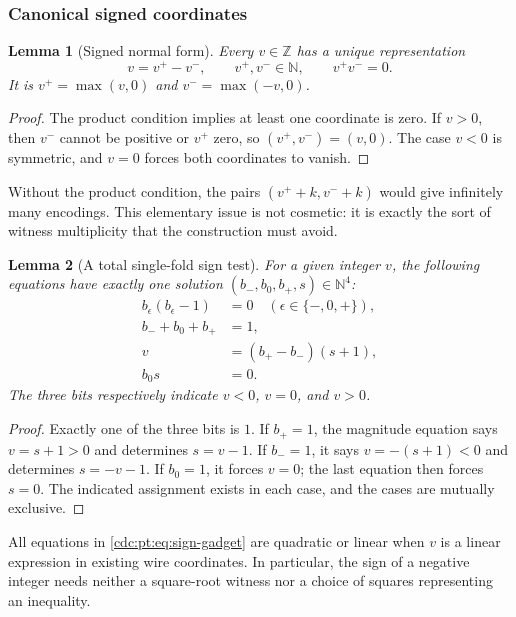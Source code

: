 \documentclass[11pt,a4paper]{article}
\newtheorem{lemma}[lemma]{Lemma}
\theoremstyle{definition}
\theoremstyle{remark}
\newcommand{\N}{\mathbb N}
\newcommand{\Z}{\mathbb Z}
\begin{document}
\subsubsection{Canonical signed coordinates}
\begin{lemma}[Signed normal form]
\label{cdc:pt:lem:signed}
Every $v\in\Z$ has a unique representation
\[
 v=v^+-v^-,\qquad v^+,v^-\in\N,\qquad v^+v^-=0.
\]
It is $v^+=\max(v,0)$ and $v^-=\max(-v,0)$.
\end{lemma}
\begin{proof}
The product condition implies at least one coordinate is zero. If $v>0$,
then $v^-$ cannot be positive or $v^+$ zero, so $(v^+,v^-)=(v,0)$.
The case $v<0$ is symmetric, and $v=0$ forces both coordinates to vanish.
\end{proof}
Without the product condition, the pairs $(v^++k,v^-+k)$ would give
infinitely many encodings. This elementary issue is not cosmetic: it is
exactly the sort of witness multiplicity that the construction must avoid.

\begin{lemma}[A total single-fold sign test]
\label{cdc:pt:lem:sign}
For a given integer $v$, the following equations have exactly one solution
$(b_-,b_0,b_+,s)\in\N^4$:
\begin{align}
 b_\epsilon(b_\epsilon-1)&=0\quad(\epsilon\in\{-,0,+\}),\nonumber\\
 b_-+b_0+b_+&=1,\label{cdc:pt:eq:sign-gadget}\\
 v&=(b_+-b_-)(s+1),\nonumber\\
 b_0s&=0.\nonumber
\end{align}
The three bits respectively indicate $v<0$, $v=0$, and $v>0$.
\end{lemma}
\begin{proof}
Exactly one of the three bits is $1$. If $b_+=1$, the magnitude equation
says $v=s+1>0$ and determines $s=v-1$. If $b_-=1$, it says
$v=-(s+1)<0$ and determines $s=-v-1$. If $b_0=1$, it forces $v=0$;
the last equation then forces $s=0$. The indicated assignment exists in
each case, and the cases are mutually exclusive.
\end{proof}
All equations in \eqref{cdc:pt:eq:sign-gadget} are quadratic or linear when $v$ is
a linear expression in existing wire coordinates. In particular, the sign
of a negative integer needs neither a square-root witness nor a choice of
squares representing an inequality.
\end{document}
